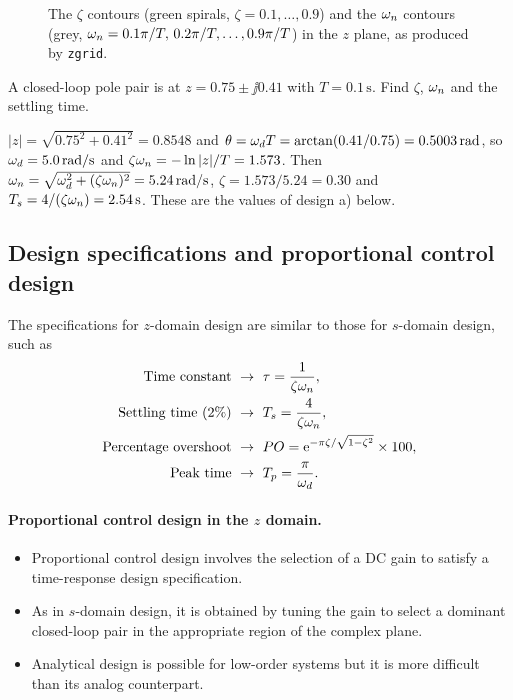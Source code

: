 \begin{figure}[H]
\centering
\figZgrid
\caption{The $\zeta$ contours (green spirals, $\zeta=0.1,\dots,0.9$) and the $\omega_n$ contours (grey,
$\omega_n=0.1\pi/T,\,0.2\pi/T,\dots,0.9\pi/T$) in the $z$ plane, as produced by \texttt{zgrid}.}
\end{figure}

\begin{problem}
A closed-loop pole pair is at $z=0.75\pm\jj0.41$ with $T=0.1\,\mathrm{s}$. Find $\zeta$, $\omega_n$ and the
settling time.
\end{problem}
\begin{solution}
$|z|=\sqrt{0.75^{2}+0.41^{2}}=0.8548$ and $\theta=\omega_d T=\arctan(0.41/0.75)=0.5003\,\mathrm{rad}$, so
$\omega_d=5.0\,\mathrm{rad/s}$ and $\zeta\omega_n=-\ln|z|/T=1.573$. Then $\omega_n=\sqrt{\omega_d^{2}+(\zeta\omega_n)^{2}}=5.24\,\mathrm{rad/s}$,
$\zeta=1.573/5.24=0.30$ and $T_s=4/(\zeta\omega_n)=2.54\,\mathrm{s}$. These are the values of design a) below.
\end{solution}

\subsection{Design specifications and proportional control design}
The specifications for $z$-domain design are similar to those for $s$-domain design, such as
\begin{align*}
  \text{Time constant}&\ \to\ \tau=\frac{1}{\zeta\omega_n},\\
  \text{Settling time (2\%)}&\ \to\ T_s=\frac{4}{\zeta\omega_n},\\
  \text{Percentage overshoot}&\ \to\ PO=\mathrm{e}^{-\pi\zeta/\sqrt{1-\zeta^{2}}}\times100,\\
  \text{Peak time}&\ \to\ T_p=\frac{\pi}{\omega_d}.
\end{align*}

\paragraph{Proportional control design in the $z$ domain.}
\begin{itemize}
  \item Proportional control design involves the selection of a DC gain to satisfy a time-response design
        specification.
  \item As in $s$-domain design, it is obtained by tuning the gain to select a dominant closed-loop pair in the
        appropriate region of the complex plane.
  \item Analytical design is possible for low-order systems but it is more difficult than its analog counterpart.
\end{itemize}

